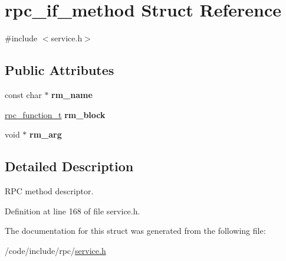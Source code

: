 \hypertarget{structrpc__if__method}{}\section{rpc\+\_\+if\+\_\+method Struct Reference}
\label{structrpc__if__method}


{\ttfamily \#include $<$service.\+h$>$}

\subsection*{Public Attributes}
\begin{DoxyCompactItemize}
\item 
const char $\ast$ {\bfseries rm\+\_\+name}\hypertarget{structrpc__if__method_a207409b75ef6c2cee361fb2ba4421c97}{}\label{structrpc__if__method_a207409b75ef6c2cee361fb2ba4421c97}

\item 
\hyperlink{service_8h_a02d3dbd723de9bd5140887c9935ff05a}{rpc\+\_\+function\+\_\+t} {\bfseries rm\+\_\+block}\hypertarget{structrpc__if__method_ad02bcfe0adc134947ab369c927e307a0}{}\label{structrpc__if__method_ad02bcfe0adc134947ab369c927e307a0}

\item 
void $\ast$ {\bfseries rm\+\_\+arg}\hypertarget{structrpc__if__method_a30f477ae1a1636164e2cc5051deb4fa1}{}\label{structrpc__if__method_a30f477ae1a1636164e2cc5051deb4fa1}

\end{DoxyCompactItemize}


\subsection{Detailed Description}
R\+PC method descriptor. 

Definition at line 168 of file service.\+h.



The documentation for this struct was generated from the following file\+:\begin{DoxyCompactItemize}
\item 
/code/include/rpc/\hyperlink{service_8h}{service.\+h}\end{DoxyCompactItemize}
